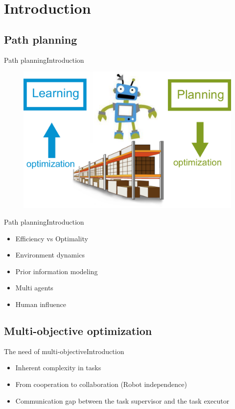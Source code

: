 \section{Introduction}

\subsection{Path planning}

\begin{frame}{Path planning}{Introduction}
	\begin{figure}
		\centering
		\includegraphics[width=.7\linewidth]{figure/robot_interaction}
		\label{fig:robot}
	\end{figure}
 \end{frame}

\begin{frame}{Path planning}{Introduction}
\begin{itemize}
\item Efficiency vs Optimality
\item Environment dynamics
\item Prior information modeling
\item Multi agents
\item Human influence
\end{itemize}
\end{frame}

\subsection{Multi-objective optimization}

\begin{frame}{The need of multi-objective}{Introduction}
\begin{itemize}
\item Inherent complexity in tasks
\item From cooperation to collaboration (Robot independence)
\item Communication gap between the task supervisor and the task executor
\end{itemize}
\end{frame}

